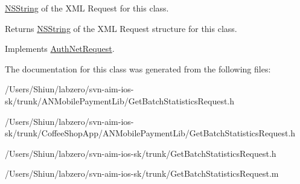 \hyperlink{class_n_s_string}{NSString} of the XML Request for this class. 

\begin{DoxyReturn}{Returns}
\hyperlink{class_n_s_string}{NSString} of the XML Request structure for this class. 
\end{DoxyReturn}


Implements \hyperlink{interface_auth_net_request_aab99d065f49b7ed086b041c1c70e2975}{AuthNetRequest}.



The documentation for this class was generated from the following files:\begin{DoxyCompactItemize}
\item 
/Users/Shiun/labzero/svn-\/aim-\/ios-\/sk/trunk/ANMobilePaymentLib/GetBatchStatisticsRequest.h\item 
/Users/Shiun/labzero/svn-\/aim-\/ios-\/sk/trunk/CoffeeShopApp/ANMobilePaymentLib/GetBatchStatisticsRequest.h\item 
/Users/Shiun/labzero/svn-\/aim-\/ios-\/sk/trunk/GetBatchStatisticsRequest.h\item 
/Users/Shiun/labzero/svn-\/aim-\/ios-\/sk/trunk/GetBatchStatisticsRequest.m\end{DoxyCompactItemize}
